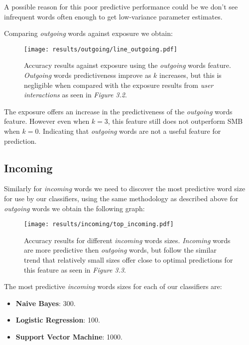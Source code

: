 A possible reason for this poor predictive performance could be we don't see infrequent words often enough to get low-variance parameter estimates.

\clearpage

Comparing \emph{outgoing} words against exposure we obtain:

\begin{figure}[h]
	\begin{center}
		\texttt{[image: results/outgoing/line\_outgoing.pdf]}
		\caption{Accuracy results against exposure using the \emph{outgoing} words feature. \emph{Outgoing} words predictiveness improve as $k$ increases, but this is
		negligible when compared with the exposure results from \emph{user interactions} as seen in \emph{Figure 3.2}.}
	\end{center}
\end{figure}

The exposure offers an increase in the predictiveness of the \emph{outgoing} words feature. However even when $k=3$, this feature still does 
not outperform SMB when $k=0$. Indicating that \emph{outgoing} words are not a useful feature for prediction.

\subsection{Incoming}
\label{sec:id}

Similarly for \emph{incoming} words we need to discover the most predictive word size for use by our classifiers, 
using the same methodology as described above for \emph{outgoing} words we obtain the following graph:

\begin{figure}[h]
	\begin{center}
		\texttt{[image: results/incoming/top\_incoming.pdf]}
		\caption{Accuracy results for different \emph{incoming} words sizes. \emph{Incoming} words are more predictive then \emph{outgoing} words, but follow
				 the similar trend that relatively small sizes offer close to optimal predictions for this feature as seen in \emph{Figure 3.3}.}
	\end{center}
\end{figure}

\clearpage

The most predictive \emph{incoming} words sizes for each of our classifiers are:
\begin{itemize}
\item \textbf{Naive Bayes}: 300.
\item \textbf{Logistic Regression}: 100.
\item \textbf{Support Vector Machine}: 1000.
\end{itemize}

